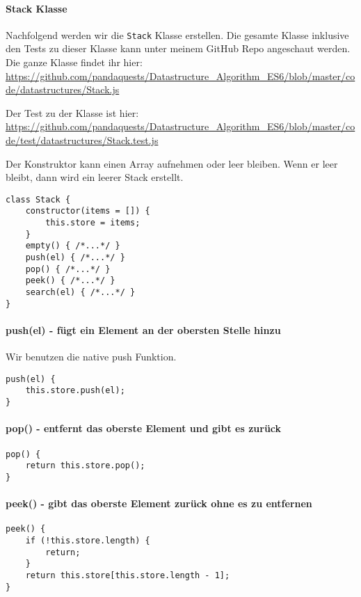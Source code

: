\documentclass[babel]{book}
\begin{document}
\paragraph{Stack Klasse}
Nachfolgend werden wir die \lstinline|Stack| Klasse erstellen. Die gesamte Klasse inklusive den Tests zu dieser Klasse kann unter meinem GitHub Repo angeschaut werden. Die ganze Klasse findet ihr hier: \url{https://github.com/pandaquests/Datastructure_Algorithm_ES6/blob/master/code/datastructures/Stack.js}

Der Test zu der Klasse ist hier: \url{https://github.com/pandaquests/Datastructure_Algorithm_ES6/blob/master/code/test/datastructures/Stack.test.js}

Der Konstruktor kann einen Array aufnehmen oder leer bleiben. Wenn er leer bleibt, dann wird ein leerer Stack erstellt.

\begin{lstlisting}[caption=Array Konstruktor]
class Stack {
	constructor(items = []) {
		this.store = items;
	}
	empty() { /*...*/ }
	push(el) { /*...*/ }
	pop() { /*...*/ }
	peek() { /*...*/ }
	search(el) { /*...*/ }
}
\end{lstlisting}

\paragraph{push(el) - fügt ein Element an der obersten Stelle hinzu} Wir benutzen die native push Funktion.
\begin{lstlisting}[caption=Array Konstruktor]
push(el) {
	this.store.push(el);
}
\end{lstlisting}

\paragraph{pop() - entfernt das oberste Element und gibt es zurück} 
\begin{lstlisting}[caption=Array Konstruktor]
pop() {
	return this.store.pop();
}
\end{lstlisting}

\paragraph{peek() - gibt das oberste Element zurück ohne es zu entfernen} 
\begin{lstlisting}[caption=Array Konstruktor]
peek() {
	if (!this.store.length) {
		return;
	}
	return this.store[this.store.length - 1];
}
\end{lstlisting}
\end{document}
